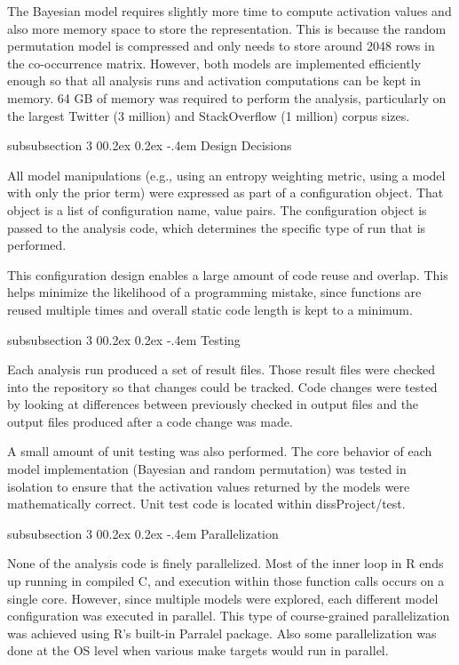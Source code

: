 \documentclass[man,floatsintext,donotrepeattitle]{apa6}
\makeatletter
\renewcommand{\subsubsection}{%
  \@startsection
  {subsubsection}%
  {3}%
  {\parindent}%
  {0\baselineskip \@plus 0.2ex \@minus 0.2ex}%
  {-.4em}%
  {\normalfont\normalsize\bfseries\addperi}}
\makeatother
\begin{document}
The Bayesian model requires slightly more time to compute activation values and also more memory space to store the representation.
This is because the random permutation model is compressed and only needs to store around \num{2048} rows in the co-occurrence matrix.
However, both models are implemented efficiently enough so that all analysis runs and activation computations can be kept in memory.
64 GB of memory was required to perform the analysis, particularly on the largest Twitter (3 million) and StackOverflow (1 million) corpus sizes.

\subsubsection{Design Decisions}

All model manipulations (e.g., using an entropy weighting metric, using a model with only the prior term) were expressed as part of a configuration object.
That object is a list of configuration name, value pairs.
The configuration object is passed to the analysis code, which determines the specific type of run that is performed.

This configuration design enables a large amount of code reuse and overlap.
This helps minimize the likelihood of a programming mistake, since functions are reused multiple times and overall static code length is kept to a minimum.

\subsubsection{Testing}

Each analysis run produced a set of result files.
Those result files were checked into the repository so that changes could be tracked.
Code changes were tested by looking at differences between previously checked in output files and the output files produced after a code change was made.

A small amount of unit testing was also performed.
The core behavior of each model implementation (Bayesian and random permutation) was tested in isolation to ensure that the activation values returned by the models were mathematically correct.
Unit test code is located within dissProject/test.

\subsubsection{Parallelization}

None of the analysis code is finely parallelized.
Most of the inner loop in R ends up running in compiled C, and execution within those function calls occurs on a single core.
However, since multiple models were explored, each different model configuration was executed in parallel.
This type of course-grained parallelization was achieved using R's built-in Parralel package.
Also some parallelization was done at the OS level when various make targets would run in parallel.
\end{document}
